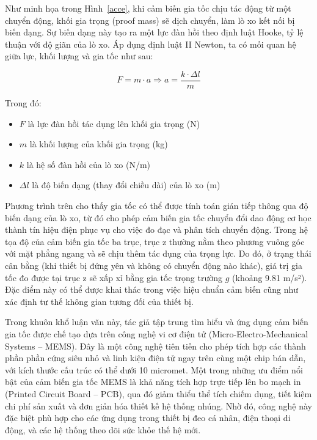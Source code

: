 Như minh họa trong Hình~\ref{acce}, khi cảm biến gia tốc chịu tác động từ một chuyển động, khối gia trọng (proof mass) sẽ dịch chuyển, làm lò xo kết nối bị biến dạng. Sự biến dạng này tạo ra một lực đàn hồi theo định luật Hooke, tỷ lệ thuận với độ giãn của lò xo. Áp dụng định luật II Newton, ta có mối quan hệ giữa lực, khối lượng và gia tốc như sau:

\begin{equation} F = m \cdot a \Rightarrow a = \frac{k \cdot \Delta l}{m} \end{equation}

Trong đó: \begin{itemize} \item $F$ là lực đàn hồi tác dụng lên khối gia trọng (N) \item $m$ là khối lượng của khối gia trọng (kg) \item $k$ là hệ số đàn hồi của lò xo (N/m) \item $\Delta l$ là độ biến dạng (thay đổi chiều dài) của lò xo (m) \end{itemize}

Phương trình trên cho thấy gia tốc có thể được tính toán gián tiếp thông qua độ biến dạng của lò xo, từ đó cho phép cảm biến gia tốc chuyển đổi dao động cơ học thành tín hiệu điện phục vụ cho việc đo đạc và phân tích chuyển động. Trong hệ tọa độ của cảm biến gia tốc ba trục, trục z thường nằm theo phương vuông góc với mặt phẳng ngang và sẽ chịu thêm tác dụng của trọng lực. Do đó, ở trạng thái cân bằng (khi thiết bị đứng yên và không có chuyển động nào khác), giá trị gia tốc đo được tại trục z sẽ xấp xỉ bằng gia tốc trọng trường $g$ (khoảng 9.81 m/s²). Đặc điểm này có thể được khai thác trong việc hiệu chuẩn cảm biến cũng như xác định tư thế không gian tương đối của thiết bị.

Trong khuôn khổ luận văn này, tác giả tập trung tìm hiểu và ứng dụng 
cảm biến gia tốc được chế tạo dựa trên công nghệ vi cơ điện tử (Micro-Electro-Mechanical Systems – MEMS). 
Đây là một công nghệ tiên tiến cho phép tích hợp các thành phần phần cứng siêu nhỏ và 
linh kiện điện tử ngay trên cùng một chip bán dẫn, với kích thước cấu trúc có thể dưới 
10 micromet. Một trong những ưu điểm nổi bật của cảm biến gia tốc MEMS là 
khả năng tích hợp trực tiếp lên bo mạch in (Printed Circuit Board – PCB), 
qua đó giảm thiểu thể tích chiếm dụng, tiết kiệm chi phí sản xuất và 
đơn giản hóa thiết kế hệ thống nhúng. Nhờ đó, công nghệ này đặc biệt phù hợp 
cho các ứng dụng trong thiết bị đeo cá nhân, điện thoại di động, và các 
hệ thống theo dõi sức khỏe thế hệ mới.


